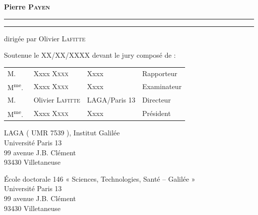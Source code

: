 \begin{titlepage}
\begin{center}
\textbf{{\LARGE Pierre \textsc{Payen}}}

\hrule
{}
{\LARGE \textbf{\doctitle}}
\hrule

{\Large
dirigée par Olivier \textsc{Lafitte}}


{\Large Soutenue le XX/XX/XXXX devant le jury composé de :}

{\Large
\begin{tabular}{l@{\hskip 0cm}lll}
M.&Xxxx \textsc{Xxxx} & Xxxx & Rapporteur\\
M\textsuperscript{me}.~&Xxxx \textsc{Xxxx} & Xxxx & Examinateur\\
M.&Olivier \textsc{Lafitte} & LAGA/Paris 13 & Directeur\\
M\textsuperscript{me}.~&Xxxx \textsc{Xxxx} & Xxxx & Président\\
\end{tabular}
}

\end{center}


\newpage

\vspace*{\fill}

\noindent
\begin{center}
\begin{minipage}[t]{0.45\textwidth}
LAGA ( UMR 7539 ), Institut Galilée\\
Université Paris 13 \\
99 avenue J.B. Clément \\
93430 Villetaneuse
\end{minipage}%
%
\hfill%
%
\begin{minipage}[t]{0.45\textwidth}
École doctorale 146 « Sciences, Technologies, Santé – Galilée » \\
Université Paris 13 \\
99 avenue J.B. Clément \\
93430 Villetaneuse
\end{minipage}
\end{center}



\end{titlepage}
\hypersetup{pageanchor=true}

\cleardoublepage